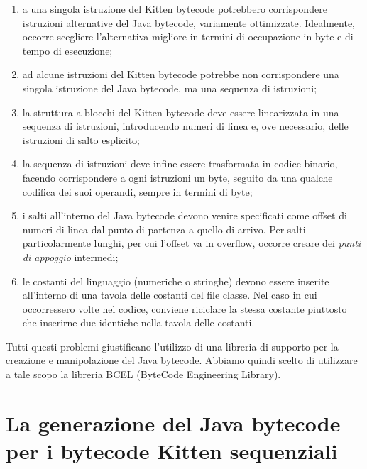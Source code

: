 \begin{enumerate}
\item a una singola istruzione del Kitten bytecode potrebbero corrispondere
      \piu istruzioni alternative del Java bytecode, variamente ottimizzate.
      Idealmente, occorre scegliere l'alternativa migliore in termini di
      occupazione in byte e di tempo di esecuzione;
\item ad alcune istruzioni del Kitten bytecode potrebbe non corrispondere
      una singola istruzione del Java bytecode, ma una sequenza di \piu
      istruzioni;
\item la struttura a blocchi del Kitten bytecode deve essere linearizzata in
      una sequenza di istruzioni, introducendo numeri di linea e,
      ove necessario, delle istruzioni di salto esplicito;
\item la sequenza di istruzioni deve infine essere trasformata in codice
      binario, facendo corrispondere a ogni istruzioni un byte, seguito da
      una qualche codifica dei suoi operandi, sempre in termini di byte;
\item i salti all'interno del Java bytecode devono venire specificati come offset
      di numeri di linea dal punto di partenza a quello di arrivo. Per
      salti particolarmente lunghi, per cui l'offset va in overflow,
      occorre creare dei \emph{punti di appoggio} intermedi;
\item le costanti del linguaggio (numeriche o stringhe) devono essere
      inserite all'interno di una tavola delle costanti del file classe.
      Nel caso in cui occorressero \piu volte nel codice, conviene
      riciclare la stessa costante piuttosto che inserirne due identiche
      nella tavola delle costanti.
\end{enumerate}
%
Tutti questi problemi giustificano l'utilizzo di una libreria di
supporto per la creazione e manipolazione del Java bytecode. Abbiamo
quindi scelto di utilizzare a tale scopo
la libreria BCEL (ByteCode Engineering Library).

\section{La generazione del Java bytecode per i bytecode Kitten sequenziali}
  \label{sec:java_bytecode_sequenziale}

